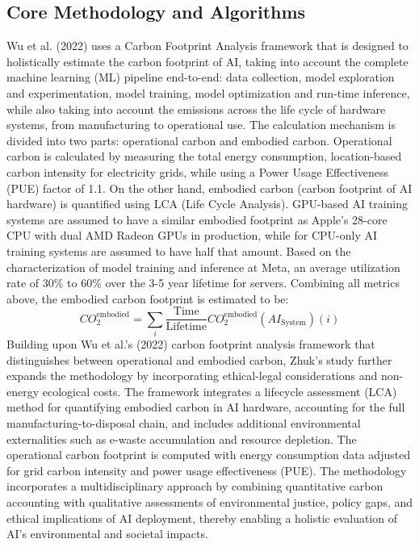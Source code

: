 \documentclass[a4paper, 12pt]{article}
\begin{document}
\subsection{Core Methodology and Algorithms} 
\hspace{24pt}Wu et al. (2022) uses a Carbon Footprint Analysis framework that is designed to holistically estimate the carbon footprint of AI, taking into account the complete machine learning (ML) pipeline end-to-end: data collection, model exploration and experimentation, model training, model optimization and run-time inference, while also taking into account the emissions across the life cycle of hardware systems, from manufacturing to operational use. The calculation mechanism is divided into two parts: operational carbon and embodied carbon. Operational carbon is calculated by measuring the total energy consumption, location-based carbon intensity for electricity grids, while using a Power Usage Effectiveness (PUE) factor of 1.1. On the other hand, embodied carbon (carbon footprint of AI hardware) is quantified using LCA (Life Cycle Analysis). GPU-based AI training systems are assumed to have a similar embodied footprint as Apple's 28-core CPU with dual AMD Radeon GPUs in production, while for CPU-only AI training systems are assumed to have half that amount.  Based on the characterization of model training and inference at Meta, an average utilization rate of 30\% to 60\% over the 3-5 year lifetime for servers. Combining all metrics above, the embodied carbon footprint is estimated to be: 
\begin{equation}
	CO_2^{\text{embodied}} = \sum_i \frac{\text{Time}}{\text{Lifetime}} CO_2^{\text{embodied}}(AI_{\text{System}})(i)
\end{equation}
\hspace{24pt}Building upon Wu et al.'s (2022) carbon footprint analysis framework that distinguishes between operational and embodied carbon, Zhuk's study further expands the methodology by incorporating ethical-legal considerations and non-energy ecological costs. The framework integrates a lifecycle assessment (LCA) method for quantifying embodied carbon in AI hardware, accounting for the full manufacturing-to-disposal chain, and includes additional environmental externalities such as e-waste accumulation and resource depletion. The operational carbon footprint is computed with energy consumption data adjusted for grid carbon intensity and power usage effectiveness (PUE). The methodology incorporates a multidisciplinary approach by combining quantitative carbon accounting with qualitative assessments of environmental justice, policy gaps, and ethical implications of AI deployment, thereby enabling a holistic evaluation of AI's environmental and societal impacts.
\end{document}

